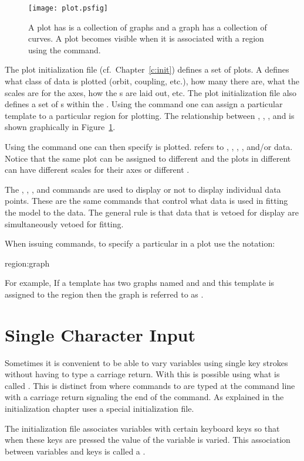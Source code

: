 \begin{figure}
  \centering
  \texttt{[image: plot.psfig]}
  \caption{A plot has is a collection of graphs and a graph has a 
collection of curves. A plot becomes visible when it 
is associated with a region using the  command.}
  \label{f:plot}
\end{figure}

The plot initialization file (cf.~Chapter~\ref{c:init}) defines a set
of  plots. A  defines what class of data is
plotted (orbit, coupling, etc.), how many  there are, what
the scales are for the  axes, how the s are laid
out, etc.  The plot initialization file also defines a set of
s within the .  Using the  command one
can assign a particular template to a particular region for plotting.
The relationship between , , , and
 is shown graphically in Figure~\ref{f:plot}.

Using the  command one can then specify  is
plotted.  refers to , , ,
, and/or  data.  Notice that the same 
plot can be assigned to different  and the plots in different
 can have different scales for their axes or different
.


The , , ,
and  commands are used to display or not to display
individual data points. These are the same commands that control what
data is used in fitting the model to the data. The general rule is
that data that is vetoed for display are simultaneously vetoed for fitting.

When issuing \tao commands, to specify a particular  in a plot
use the notation:
\begin{example}
  region:graph
\end{example}
For example, If a template has two graphs named  and  and
this template is assigned to the  region then the  graph
is referred to as . 

\section{Single Character Input}

Sometimes it is convenient to be able to vary variables using single key strokes
without having to type a carriage return.
With \tao this is possible using what is called . This is distinct from
 where commands to \tao are typed at the command line with a carriage 
return signaling the end of the command. As explained in the initialization chapter
 uses a special initialization file.

The  initialization file associates variables with certain keyboard keys
so that when these keys are pressed the value of the variable is varied. This association
between variables and keys is called a .

